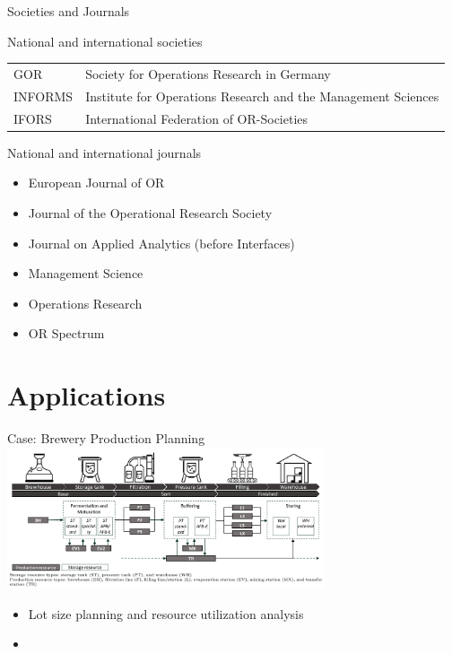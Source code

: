 \documentclass[aspectratio=1610,12pt]{beamer}
\begin{document}
\begin{frame}{Societies and Journals}
    \begin{block}{National and international societies}
    \vspace{0.07cm}
        \begin{tabular}{lp{}}
          GOR     &   Society for Operations Research in Germany\\
          INFORMS &   Institute for Operations Research and the Management Sciences \\
          IFORS   &   International Federation of OR-Societies
        \end{tabular}
    \end{block}
    
    \begin{block}{National and international journals}
        \begin{itemize}
            \item European Journal of OR
            \item Journal of the Operational Research Society
            \item Journal on Applied Analytics (before Interfaces)
            \item Management Science
            \item Operations Research
            \item OR Spectrum
        \end{itemize}
    \end{block}
\end{frame}

\section{Applications}

\begin{frame}[fragile]{Case: Brewery Production Planning}
    \center\includegraphics[width=0.7\textwidth]{images/FS.jpg}
    \begin{itemize}
         \item Lot size planning and resource utilization analysis
         \item {}
    \end{itemize}
\end{frame}
\end{document}
